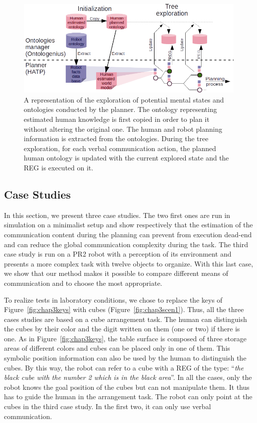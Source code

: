 \documentclass[a4paper,11pt,twoside]{StyleThese}
\begin{document}
\begin{figure}[t!]
\centering
\includegraphics[width=\textwidth]{figures/chapter3/struct.png}
\caption{\label{fig:integration} A representation of the exploration of potential mental states and ontologies conducted by the planner. The ontology representing estimated human knowledge is first copied in order to plan it without altering the original one. The human and robot planning information is extracted from the ontologies. During the tree exploration, for each verbal communication action, the planned human ontology is updated with the current explored state and the REG is executed on it.}
\end{figure}

\subsection{Case Studies}
\label{sec:Case_studies}

In this section, we present three case studies. The two first ones are run in simulation on a minimalist setup and show respectively that the estimation of the communication content during the planning can prevent from execution dead-end and can reduce the global communication complexity during the task. The third case study is run on a PR2 robot with a perception of its environment and presents a more complex task with twelve objects to organize. With this last case, we show that our method makes it possible to compare different means of communication and to choose the most appropriate.

To realize tests in laboratory conditions, we chose to replace the keys of Figure~\ref{fig:chap3keys} with cubes (Figure~\ref{fig:chap3scen1}). Thus, all the three cases studies are based on a cube arrangement task. The human can distinguish the cubes by their color and the digit written on them (one or two) if there is one. As in Figure~\ref{fig:chap3keys}, the table surface is composed of three storage areas of different colors and cubes can be placed only in one of them. This symbolic position information can also be used by the human to distinguish the cubes. By this way, the robot can refer to a cube with a REG of the type: ``\textit{the black cube with the number 2 which is in the black area}''. In all the cases, only the robot knows the goal position of the cubes but can not manipulate them. It thus has to guide the human in the arrangement task. The robot can only point at the cubes in the third case study. In the first two, it can only use verbal communication.
\end{document}
